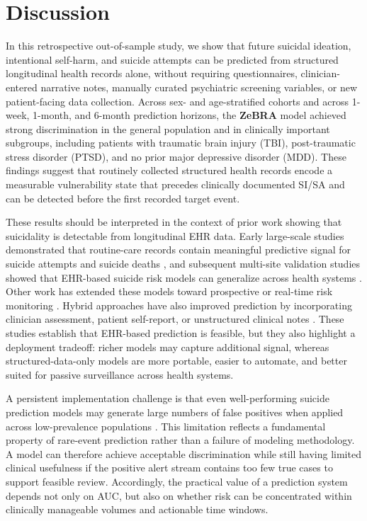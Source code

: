 \documentclass[onecolumn, compsoc,11pt]{IEEEtran}
\def\zebra{\textbf{ZeBRA}\xspace}
\begin{document}
\section*{Discussion}

In this retrospective out-of-sample study, we show that future suicidal ideation, intentional self-harm, and suicide attempts can be predicted from structured longitudinal health records alone, without requiring questionnaires, clinician-entered narrative notes, manually curated psychiatric screening variables, or new patient-facing data collection. Across sex- and age-stratified cohorts and across 1-week, 1-month, and 6-month prediction horizons, the \zebra model achieved strong discrimination in the general population and in clinically important subgroups, including patients with traumatic brain injury (TBI), post-traumatic stress disorder (PTSD), and no prior major depressive disorder (MDD). These findings suggest that routinely collected structured health records encode a measurable vulnerability state that precedes clinically documented SI/SA and can be detected before the first recorded target event.

These results should be interpreted in the context of prior work showing that suicidality is detectable from longitudinal EHR data. Early large-scale studies demonstrated that routine-care records contain meaningful predictive signal for suicide attempts and suicide deaths \cite{simon2018predicting,barakcorren2017}, and subsequent multi-site validation studies showed that EHR-based suicide risk models can generalize across health systems \cite{barakcorren2020,barakcorren2020validation}. Other work has extended these models toward prospective or real-time risk monitoring \cite{walsh2017,walsh2021,walsh2021predicting}. Hybrid approaches have also improved prediction by incorporating clinician assessment, patient self-report, or unstructured clinical notes \cite{nock2022,tsui2021natural,tsui2021,obeid2020identifying}. These studies establish that EHR-based prediction is feasible, but they also highlight a deployment tradeoff: richer models may capture additional signal, whereas structured-data-only models are more portable, easier to automate, and better suited for passive surveillance across health systems.

A persistent implementation challenge is that even well-performing suicide prediction models may generate large numbers of false positives when applied across low-prevalence populations \cite{belsher2019prediction}. This limitation reflects a fundamental property of rare-event prediction rather than a failure of modeling methodology. A model can therefore achieve acceptable discrimination while still having limited clinical usefulness if the positive alert stream contains too few true cases to support feasible review. Accordingly, the practical value of a prediction system depends not only on AUC, but also on whether risk can be concentrated within clinically manageable volumes and actionable time windows.
\end{document}
